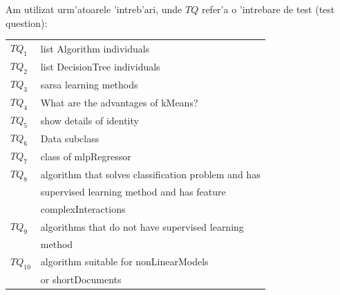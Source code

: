 \documentclass[12pt,a4paper,twoside]{report}
\begin{document}
Am utilizat urm'atoarele 'intreb'ari, unde $TQ$ refer'a o 'intrebare de test (test question):
\newline

\begin{small}
\begin{tabular}{ll}
$TQ_1$ & list Algorithm individuals\\
$TQ_2$ & list DecisionTree individuals\\
$TQ_3$ & sarsa learning methods\\
$TQ_4$ & What are the advantages of kMeans?\\
$TQ_5$ & show details of identity\\
$TQ_6$ & Data subclass\\
$TQ_7$ & class of mlpRegressor\\
$TQ_8$ & algorithm that solves classification problem and has\\
 & supervised learning method and has feature \\
 & complexInteractions \\
$TQ_9$ & algorithms that do not have supervised learning  \\
& method \\
$TQ_{10}$ & algorithm suitable for nonLinearModels \\
& or shortDocuments\\
\end{tabular}
\end{small}
\end{document}
